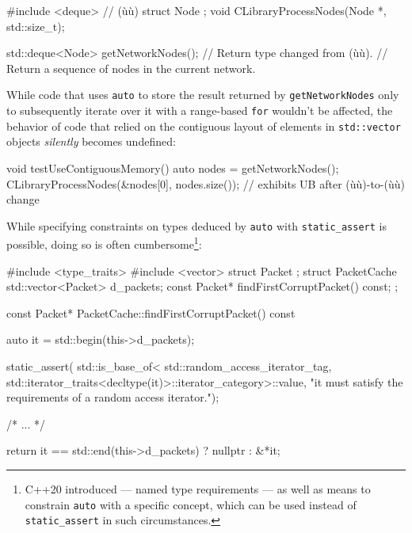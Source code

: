 \begin{emcppshiddenlisting}[emcppsbatch=e18]
#include <deque>     // (ù{}ù)
struct Node {};
void CLibraryProcessNodes(Node *, std::size_t);
\end{emcppshiddenlisting}
\begin{emcppslisting}[emcppsbatch=e18]
std::deque<Node> getNetworkNodes();  // Return type changed from (ù{}ù).
    // Return a sequence of nodes in the current network.
\end{emcppslisting}
    
\noindent While code that uses \lstinline!auto! to store the result returned by
\lstinline!getNetworkNodes! only to subsequently iterate over it with a
range-based \lstinline!for! wouldn't be affected, the behavior of code that
relied on the contiguous layout of elements in \lstinline!std::vector!
objects \emph{silently} becomes undefined:

\begin{emcppslisting}[emcppsbatch=e18]
void testUseContiguousMemory()
{
    auto nodes = getNetworkNodes();
    CLibraryProcessNodes(&nodes[0], nodes.size());  
        // exhibits UB after (ù{}ù)-to-(ù{}ù) change
}
\end{emcppslisting}
    
\noindent While specifying constraints on types deduced by
\lstinline!auto! with \lstinline!static_assert! is possible, doing so is often
cumbersome{\cprotect\footnote{C++20 introduced  ---
named type requirements --- as well as means to constrain
\lstinline!auto! with a specific concept, which can be used instead of
  \lstinline!static_assert! in such circumstances.}}:

\begin{emcppshiddenlisting}[emcppsbatch=e19]
#include <type_traits>
#include <vector>
struct Packet {};
struct PacketCache {
    std::vector<Packet> d_packets;
    const Packet* findFirstCorruptPacket() const;
};
\end{emcppshiddenlisting}
\begin{emcppslisting}[emcppsbatch=e19]
const Packet* PacketCache::findFirstCorruptPacket() const
{
    auto it = std::begin(this->d_packets);

    static_assert(
        std::is_base_of<
            std::random_access_iterator_tag,
            std::iterator_traits<decltype(it)>::iterator_category>::value,
        "it must satisfy the requirements of a random access iterator.");

    /* ... */

    return it == std::end(this->d_packets) ? nullptr : &*it;
}
\end{emcppslisting}
    

